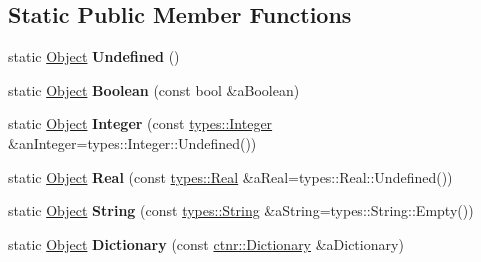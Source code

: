 \subsection*{Static Public Member Functions}
\begin{DoxyCompactItemize}
\item 
\mbox{\label{classlibrary_1_1core_1_1ctnr_1_1_object_a44ab889938fb505237c87feedd6a6770}} 
static \hyperlink{classlibrary_1_1core_1_1ctnr_1_1_object}{Object} {\bfseries Undefined} ()
\item 
\mbox{\label{classlibrary_1_1core_1_1ctnr_1_1_object_aa14cfd528f7d2dcc3d813aacfe504e4f}} 
static \hyperlink{classlibrary_1_1core_1_1ctnr_1_1_object}{Object} {\bfseries Boolean} (const bool \&a\+Boolean)
\item 
\mbox{\label{classlibrary_1_1core_1_1ctnr_1_1_object_a6746a69f0507b2c7ad8ebdf3d873b083}} 
static \hyperlink{classlibrary_1_1core_1_1ctnr_1_1_object}{Object} {\bfseries Integer} (const \hyperlink{classlibrary_1_1core_1_1types_1_1_integer}{types\+::\+Integer} \&an\+Integer=types\+::\+Integer\+::\+Undefined())
\item 
\mbox{\label{classlibrary_1_1core_1_1ctnr_1_1_object_ab3928ff53382f2f07b2c8e148d764136}} 
static \hyperlink{classlibrary_1_1core_1_1ctnr_1_1_object}{Object} {\bfseries Real} (const \hyperlink{classlibrary_1_1core_1_1types_1_1_real}{types\+::\+Real} \&a\+Real=types\+::\+Real\+::\+Undefined())
\item 
\mbox{\label{classlibrary_1_1core_1_1ctnr_1_1_object_a9f32df55a59989616f28c673ec0fbc22}} 
static \hyperlink{classlibrary_1_1core_1_1ctnr_1_1_object}{Object} {\bfseries String} (const \hyperlink{classlibrary_1_1core_1_1types_1_1_string}{types\+::\+String} \&a\+String=types\+::\+String\+::\+Empty())
\item 
\mbox{\label{classlibrary_1_1core_1_1ctnr_1_1_object_acbef515c575895f58703ce5747342e9e}} 
static \hyperlink{classlibrary_1_1core_1_1ctnr_1_1_object}{Object} {\bfseries Dictionary} (const \hyperlink{classlibrary_1_1core_1_1ctnr_1_1_dictionary}{ctnr\+::\+Dictionary} \&a\+Dictionary)

\end{DoxyCompactItemize}
